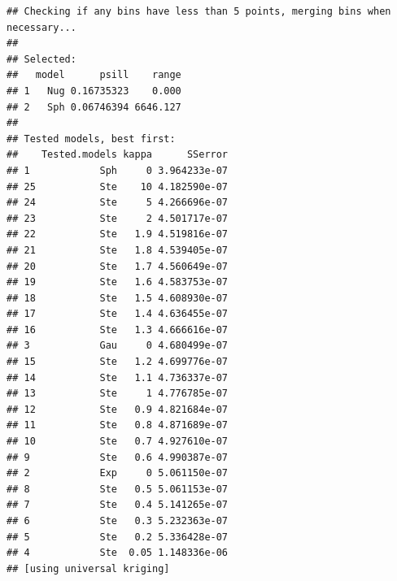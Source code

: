 \documentclass[10pt,b5paper,]{book}
\newenvironment{Shaded}{\begin{snugshade}}{\end{snugshade}}
\newcommand{\CommentTok}[1]{\textcolor[rgb]{0.56,0.35,0.01}{\textit{#1}}}
\newcommand{\DataTypeTok}[1]{\textcolor[rgb]{0.13,0.29,0.53}{#1}}
\newcommand{\DecValTok}[1]{\textcolor[rgb]{0.00,0.00,0.81}{#1}}
\newcommand{\KeywordTok}[1]{\textcolor[rgb]{0.13,0.29,0.53}{\textbf{#1}}}
\newcommand{\NormalTok}[1]{#1}
\newcommand{\OperatorTok}[1]{\textcolor[rgb]{0.81,0.36,0.00}{\textbf{#1}}}
\newcommand{\OtherTok}[1]{\textcolor[rgb]{0.56,0.35,0.01}{#1}}
\newcommand{\StringTok}[1]{\textcolor[rgb]{0.31,0.60,0.02}{#1}}
\theoremstyle{definition}
\theoremstyle{definition}
\theoremstyle{definition}
\theoremstyle{remark}
\begin{document}
\begin{Shaded}
\end{Shaded}

\begin{verbatim}
## Checking if any bins have less than 5 points, merging bins when necessary...
## 
## Selected:
##   model      psill    range
## 1   Nug 0.16735323    0.000
## 2   Sph 0.06746394 6646.127
## 
## Tested models, best first:
##    Tested.models kappa      SSerror
## 1            Sph     0 3.964233e-07
## 25           Ste    10 4.182590e-07
## 24           Ste     5 4.266696e-07
## 23           Ste     2 4.501717e-07
## 22           Ste   1.9 4.519816e-07
## 21           Ste   1.8 4.539405e-07
## 20           Ste   1.7 4.560649e-07
## 19           Ste   1.6 4.583753e-07
## 18           Ste   1.5 4.608930e-07
## 17           Ste   1.4 4.636455e-07
## 16           Ste   1.3 4.666616e-07
## 3            Gau     0 4.680499e-07
## 15           Ste   1.2 4.699776e-07
## 14           Ste   1.1 4.736337e-07
## 13           Ste     1 4.776785e-07
## 12           Ste   0.9 4.821684e-07
## 11           Ste   0.8 4.871689e-07
## 10           Ste   0.7 4.927610e-07
## 9            Ste   0.6 4.990387e-07
## 2            Exp     0 5.061150e-07
## 8            Ste   0.5 5.061153e-07
## 7            Ste   0.4 5.141265e-07
## 6            Ste   0.3 5.232363e-07
## 5            Ste   0.2 5.336428e-07
## 4            Ste  0.05 1.148336e-06
## [using universal kriging]
\end{verbatim}

\begin{Shaded}
\end{Shaded}
\end{document}
